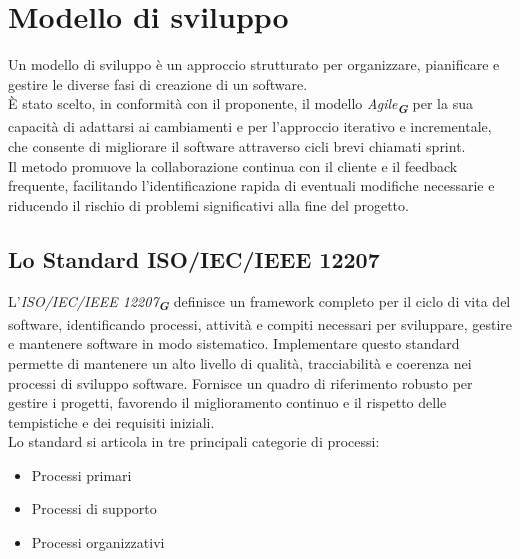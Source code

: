 
\section{Modello di sviluppo}
\label{sec:modello_sviluppo}
Un modello di sviluppo è un approccio strutturato per organizzare, pianificare e gestire le diverse fasi di creazione di un software.\\
È stato scelto, in conformità con il proponente, il modello \emph{Agile}\textsubscript{\textit{\textbf{G}}} per la sua capacità di adattarsi ai cambiamenti e per l’approccio iterativo e incrementale, che consente di migliorare il software attraverso cicli brevi chiamati sprint.\\
Il metodo promuove la collaborazione continua con il cliente e il feedback frequente, facilitando l’identificazione rapida di eventuali modifiche necessarie e riducendo il rischio di problemi significativi alla fine del progetto.\\

\subsection{Lo Standard ISO/IEC/IEEE 12207}
L'\emph{ISO/IEC/IEEE 12207}\textsubscript{\textit{\textbf{G}}} definisce un framework completo per il ciclo di vita del software, identificando processi, attività e compiti necessari per sviluppare, gestire e mantenere software in modo sistematico. Implementare questo standard permette di mantenere un alto livello di qualità, tracciabilità e coerenza nei processi di sviluppo software. Fornisce un quadro di riferimento robusto per gestire i progetti, favorendo il miglioramento continuo e il rispetto delle tempistiche e dei requisiti iniziali.\\
Lo standard si articola in tre principali categorie di processi:
\begin{itemize}
    \item Processi primari
    \item Processi di supporto
    \item Processi organizzativi
\end{itemize}

